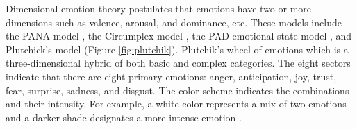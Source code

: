 Dimensional emotion theory postulates that emotions have two or more dimensions such as valence, arousal, and dominance, etc. These models include the PANA model \cite{emotions7-watson1985toward}, the Circumplex model \cite{emotions8-russell1980circumplex}, the PAD emotional state model \cite{emotions9-mehrabian1995framework}, and Plutchick’s model \cite{plutchik_model} (Figure \ref{fig:plutchik}). Plutchik's wheel of emotions which is a three-dimensional hybrid of both basic and complex categories. The eight sectors indicate that there are eight primary emotions: anger, anticipation, joy, trust, fear, surprise, sadness, and disgust. The color scheme indicates the combinations and their intensity. For example, a white color represents a mix of two emotions and a darker shade designates a more intense emotion \cite{HP_RPP}.

